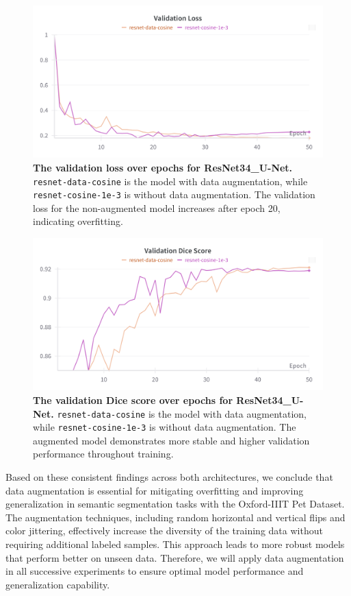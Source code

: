 \documentclass[twocolumn,a4paper]{article}
\begin{document}
\begin{figure}[H]
\centering
\includegraphics[width=0.95\linewidth]{figs/aug_resnet_val_loss}
\caption{\textbf{The validation loss over epochs for ResNet34\_U-Net.} \texttt{resnet-data-cosine} is the model with data augmentation, while \texttt{resnet-cosine-1e-3} is without data augmentation. The validation loss for the non-augmented model increases after epoch 20, indicating overfitting.}
\label{fig:augresnetvalloss}
\end{figure}
\begin{figure}[H]
\centering
\includegraphics[width=0.95\linewidth]{figs/aug_resnet_val_dice}
\caption{\textbf{The validation Dice score over epochs for ResNet34\_U-Net.} \texttt{resnet-data-cosine} is the model with data augmentation, while \texttt{resnet-cosine-1e-3} is without data augmentation. The augmented model demonstrates more stable and higher validation performance throughout training.}
\label{fig:augresnetvaldice}
\end{figure}

Based on these consistent findings across both architectures, we conclude that data augmentation is essential for mitigating overfitting and improving generalization in semantic segmentation tasks with the Oxford-IIIT Pet Dataset. The augmentation techniques, including random horizontal and vertical flips and color jittering, effectively increase the diversity of the training data without requiring additional labeled samples. This approach leads to more robust models that perform better on unseen data. Therefore, we will apply data augmentation in all successive experiments to ensure optimal model performance and generalization capability.
\end{document}
